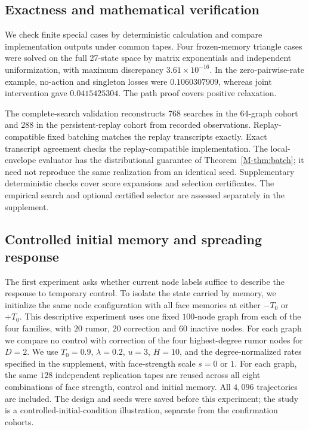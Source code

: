 \documentclass[preprint,11pt,sort&compress]{elsarticle}
\begin{document}
\subsection{Exactness and mathematical verification}
\label{sec:verification}
We check finite special cases by deterministic calculation and compare implementation outputs under common tapes. Four frozen-memory triangle cases were solved on the full 27-state space by matrix exponentials and independent uniformization, with maximum discrepancy $3.61\times10^{-16}$. In the zero-pairwise-rate example, no-action and singleton losses were $0.1060307909$, whereas joint intervention gave $0.0415425304$. The path proof covers positive relaxation.

The complete-search validation reconstructs 768 searches in the 64-graph cohort and 288 in the persistent-replay cohort from recorded observations. Replay-compatible fixed batching matches the replay transcripts exactly. Exact transcript agreement checks the replay-compatible implementation. The local-envelope evaluator has the distributional guarantee of Theorem~\ref{M-thm:batch}; it need not reproduce the same realization from an identical seed. Supplementary deterministic checks cover score expansions and selection certificates. The empirical search and optional certified selector are assessed separately in the supplement.

\subsection{Controlled initial memory and spreading response}
\label{sec:memory_response}
The first experiment asks whether current node labels suffice to describe the response to temporary control. To isolate the state carried by memory, we initialize the same node configuration with all face memories at either $-T_0$ or $+T_0$. This descriptive experiment uses one fixed $100$-node graph from each of the four families, with $20$ rumor, $20$ correction and $60$ inactive nodes. For each graph we compare no control with correction of the four highest-degree rumor nodes for $D=2$. We use $T_0=0.9$, $\lambda=0.2$, $u=3$, $H=10$, and the degree-normalized rates specified in the supplement, with face-strength scale $s=0$ or $1$. For each graph, the same $128$ independent replication tapes are reused across all eight combinations of face strength, control and initial memory. All $4,096$ trajectories are included. The design and seeds were saved before this experiment; the study is a controlled-initial-condition illustration, separate from the confirmation cohorts.
\end{document}
